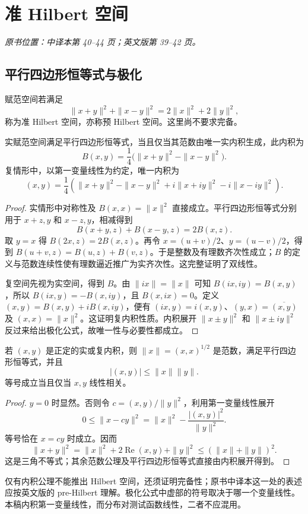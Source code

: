 \section{准 Hilbert 空间}\label{sec:yosida-01-05}
\noindent\textit{原书位置：中译本第 40--44 页；英文版第 39--42 页。}

\subsection{平行四边形恒等式与极化}
\begin{definition}[准 Hilbert 空间]
赋范空间若满足
\[
 \|x+y\|^2+\|x-y\|^2=2\|x\|^2+2\|y\|^2,
\]
称为准 Hilbert 空间，亦称预 Hilbert 空间。这里尚不要求完备。
\end{definition}
\begin{theorem}\label{thm:y1-polarization}
实赋范空间满足平行四边形恒等式，当且仅当其范数由唯一实内积生成，此内积为
\[
 B(x,y)=\frac14\bigl(\|x+y\|^2-\|x-y\|^2\bigr).
\]
复情形中，以第一变量线性为约定，唯一内积为
\[
 (x,y)=\frac14\left(\|x+y\|^2-\|x-y\|^2
 +i\|x+iy\|^2-i\|x-iy\|^2\right).
\]
\end{theorem}
\begin{proof}
实情形中对称性及 $B(x,x)=\|x\|^2$ 直接成立。平行四边形恒等式分别用于 $x+z,y$ 和 $x-z,y$，相减得到
\[
 B(x+y,z)+B(x-y,z)=2B(x,z).
\]
取 $y=x$ 得 $B(2x,z)=2B(x,z)$。再令 $x=(u+v)/2$、$y=(u-v)/2$，得到 $B(u+v,z)=B(u,z)+B(v,z)$。于是整数及有理数齐次性成立；$B$ 的定义与范数连续性使有理数逼近推广为实齐次性。这完整证明了双线性。

复空间先视为实空间，得到 $B$。由 $\|ix\|=\|x\|$ 可知 $B(ix,iy)=B(x,y)$，所以 $B(ix,y)=-B(x,iy)$，且 $B(x,ix)=0$。定义 $(x,y)=B(x,y)+iB(x,iy)$，便有 $(ix,y)=i(x,y)$、$(y,x)=\overline{(x,y)}$ 及 $(x,x)=\|x\|^2$。这证明复内积性质。内积展开 $\|x\pm y\|^2$ 和 $\|x\pm iy\|^2$ 反过来给出极化公式，故唯一性与必要性都成立。
\end{proof}

\begin{theorem}\label{thm:y1-schwarz}
若 $(x,y)$ 是正定的实或复内积，则 $\|x\|=(x,x)^{1/2}$ 是范数，满足平行四边形恒等式，并且
\[
 |(x,y)|\le\|x\|\|y\|.
\]
等号成立当且仅当 $x,y$ 线性相关。
\end{theorem}
\begin{proof}
$y=0$ 时显然。否则令 $c=(x,y)/\|y\|^2$，利用第一变量线性展开
\[
 0\le\|x-cy\|^2=\|x\|^2-\frac{|(x,y)|^2}{\|y\|^2}.
\]
等号恰在 $x=cy$ 时成立。因而
\[
 \|x+y\|^2=\|x\|^2+2\operatorname{Re}(x,y)+\|y\|^2
 \le(\|x\|+\|y\|)^2.
\]
这是三角不等式；其余范数公理及平行四边形恒等式直接由内积展开得到。
\end{proof}
\begin{remark}[补充：完备性与共轭位置]
仅有内积公理不能推出 Hilbert 空间，还须证明完备性；原书中译本这一处的表述应按英文版的 pre-Hilbert 理解。极化公式中虚部的符号取决于哪一个变量线性。本稿内积第一变量线性，而分布对测试函数线性，二者不应混用。
\end{remark}

